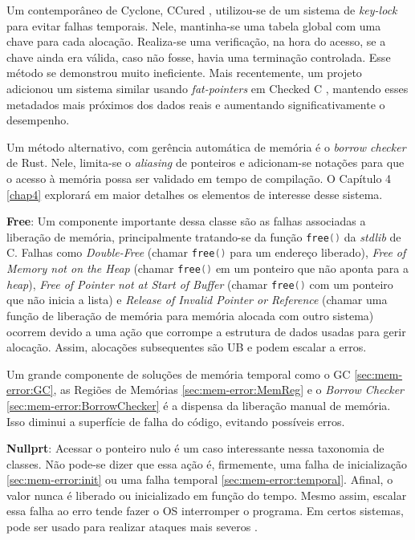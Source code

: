 \label{sec:mem-error:KeyLock}
Um contemporâneo de Cyclone, CCured \cite{CCURED}, utilizou-se de um sistema de \emph{key-lock} para evitar falhas temporais. Nele, mantinha-se uma tabela global com uma chave para cada alocação. Realiza-se uma verificação, na hora do acesso, se a chave ainda era válida, caso não fosse, havia uma terminação controlada. Esse método se demonstrou muito ineficiente. Mais recentemente, um projeto adicionou um sistema similar usando \emph{fat-pointers} em Checked C \cite{FATPOINTERS}, mantendo esses metadados mais próximos dos dados reais e aumentando significativamente o desempenho.

\label{sec:mem-error:BorrowChecker}
Um método alternativo, com gerência automática de memória é o \emph{borrow checker} de Rust. Nele, limita-se o \emph{aliasing} de ponteiros e adicionam-se notações para que o acesso à memória possa ser validado em tempo de compilação. O Capítulo 4 \ref{chap4} explorará em maior detalhes os elementos de interesse desse sistema. 

\newcommand{\FREE}{\lstinline[language=C]|free()| }
\label{sec:mem-error:temporal:free}

\textbf{Free}: Um componente importante dessa classe são as falhas associadas a liberação de memória, principalmente tratando-se da função \FREE da \emph{stdlib} de C. Falhas como \emph{Double-Free} (chamar \FREE para um endereço liberado), \emph{Free of Memory not on the Heap} (chamar \FREE em um ponteiro que não aponta para a \emph{heap}), \emph{Free of Pointer not at Start of Buffer} (chamar \FREE com um ponteiro que não inicia a lista) e \emph{Release of Invalid Pointer or Reference} (chamar uma função de liberação de memória para memória alocada com outro sistema) ocorrem devido a uma ação que corrompe a estrutura de dados usadas para gerir alocação. Assim, alocações subsequentes são UB e podem escalar a erros.

Um grande componente de soluções de memória temporal como o GC \ref{sec:mem-error:GC}, as Regiões de Memórias \ref{sec:mem-error:MemReg} e o \emph{Borrow Checker} \ref{sec:mem-error:BorrowChecker} é a dispensa da liberação manual de memória. Isso diminui a superfície de falha do código, evitando possíveis erros.

\label{sec:mem-error:temporal:null}

\textbf{Nullprt}: Acessar o ponteiro nulo é um caso interessante nessa taxonomia de classes. Não pode-se dizer que essa ação é, firmemente, uma falha de inicialização \ref{sec:mem-error:init} ou uma falha temporal \ref{sec:mem-error:temporal}. Afinal, o valor nunca é liberado ou inicializado em função do tempo. Mesmo assim, escalar essa falha ao erro tende fazer o OS interromper o programa. Em certos sistemas, pode ser usado para realizar ataques mais severos \cite[p.4]{MemErrorPastPresentFuture}.

